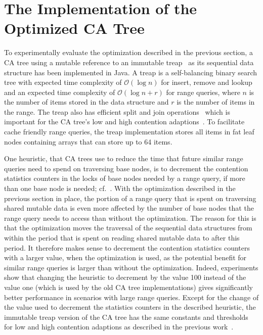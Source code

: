 \documentclass[a4paper,UKenglish]{oasics}
\begin{document}
\section{The Implementation of the Optimized CA Tree\label{immoptimpl}}
To experimentally evaluate the optimization described in the previous section, a CA tree using a mutable reference to an immutable treap~\cite{Seidel1996} as its sequential data structure has been implemented in Java.
A treap is a self-balancing binary search tree with expected time complexity of $\mathcal{O}(\log{}n)$ for insert, remove and lookup and an expected time complexity of $\mathcal{O}(\log{}n +r)$ for range queries, where $n$ is the number of items stored in the data structure and $r$ is the number of items in the range.
The treap also has efficient split and join operations~\cite{Seidel1996} which is important for the CA tree's low and high contention adaptions~\cite{CATreeISPDC}.
To facilitate cache friendly range queries, the treap implementation stores all items in fat leaf nodes containing arrays that can store up to 64 items.


One heuristic, that CA trees use to reduce the time that future similar range queries need to spend on traversing base nodes, is to decrement the contention statistics counters in the locks of base nodes needed by a range query, if more than one base node is needed; cf.~\cite{CATreeLCPC}.
With the optimization described in the previous section in place, the portion of a range query that is spent on traversing shared mutable data is even more affected by the number of base nodes that the range query needs to access than without the optimization.
The reason for this is that the optimization moves the traversal of the sequential data structures from within the period that is spent on reading shared mutable data to after this period. 
It therefore makes sense to decrement the contention statistics counters with a larger value, when the optimization is used, as the potential benefit for similar range queries is larger than without the optimization.
Indeed, experiments show that changing the heuristic to decrement by the value 100 instead of the value one (which is used by the old CA tree implementations) gives significantly better performance in scenarios with large range queries.
Except for the change of the value used to decrement the statistics counters in the described heuristic, the immutable treap version of the CA tree has the same constants and thresholds for low and high contention adaptions as described in the previous work~\cite{CATreeLCPC}.
\end{document}
